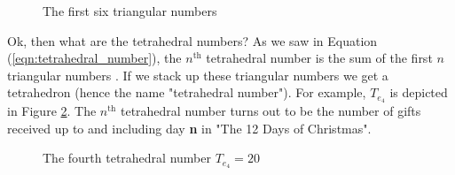 \documentclass{article}
\theoremstyle{definition}
\begin{document}
\vspace{1.05em}
\begin{figure}[H]
  \caption{The first six triangular numbers}
  \label{fig:triangular_numbers}
\end{figure}


\noindent
Ok, then what are the tetrahedral numbers? As we saw in Equation
(\ref{eqn:tetrahedral_number}), the $n^{\text{th}}$ tetrahedral
number is the sum of the first $n$ triangular numbers
\cite{wolfram:tetrahedral_numbers}. If we stack up these
triangular numbers we get a tetrahedron (hence the name
"tetrahedral number"). For example, $T_{e_{4}}$ is depicted in
Figure \ref{fig:tetrahedral_numbers}. The $n^{\text{th}}$
tetrahedral number turns out to be the number of gifts received
up to and including day {\bf n} in "The 12 Days of Christmas".
%
%
%
\begin{figure}[H]
  \caption{The fourth tetrahedral number $T_{e_{4}} = 20$}
  \label{fig:tetrahedral_numbers}
\end{figure}
%
%
%
\end{document}
